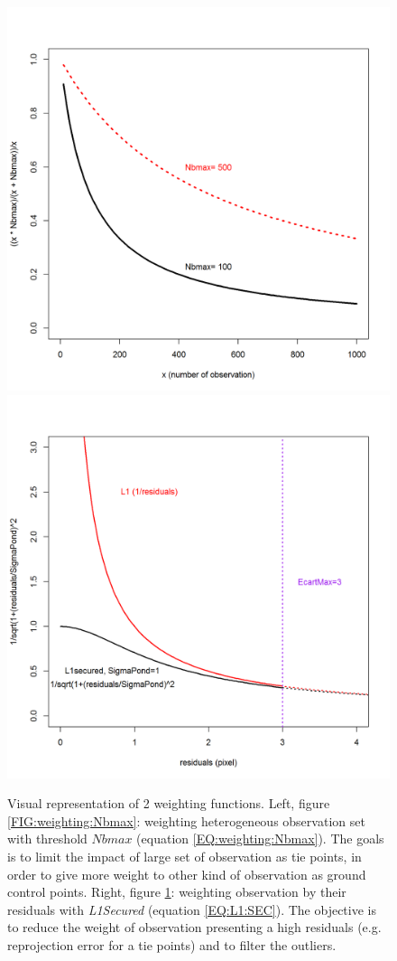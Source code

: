 \begin{figure}
\centering
{\includegraphics[width=0.49\linewidth]{FIGS/Other/weightingNbmax.png}\label{FIG:weighting:Nbmax}}
{\includegraphics[width=0.49\linewidth]{FIGS/Other/weightingresid.png}\label{FIG:weighting:resid}}
\caption{ Visual representation of 2 weighting functions. Left, figure \ref{FIG:weighting:Nbmax}: weighting heterogeneous observation set with threshold $Nbmax$ (equation \ref{EQ:weighting:Nbmax}). The goals is to limit the impact of large set of observation as tie points, in order to give more weight to other kind of observation as ground control points. Right, figure \ref{FIG:weighting:resid}: weighting observation by their residuals with {\it L1Secured} (equation \ref{EQ:L1:SEC}). The objective is to reduce the weight of observation presenting a high residuals (e.g. reprojection error for a tie points) and to filter the outliers.}
\end{figure}

